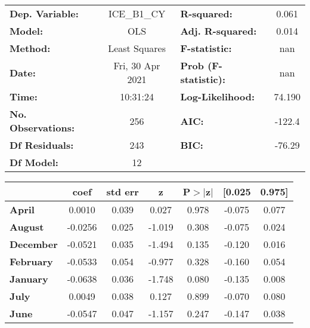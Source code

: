 \begin{center}
\begin{tabular}{lclc}
\toprule
\textbf{Dep. Variable:}    &   ICE\_B1\_CY    & \textbf{  R-squared:         } &     0.061   \\
\textbf{Model:}            &       OLS        & \textbf{  Adj. R-squared:    } &     0.014   \\
\textbf{Method:}           &  Least Squares   & \textbf{  F-statistic:       } &       nan   \\
\textbf{Date:}             & Fri, 30 Apr 2021 & \textbf{  Prob (F-statistic):} &      nan    \\
\textbf{Time:}             &     10:31:24     & \textbf{  Log-Likelihood:    } &    74.190   \\
\textbf{No. Observations:} &         256      & \textbf{  AIC:               } &    -122.4   \\
\textbf{Df Residuals:}     &         243      & \textbf{  BIC:               } &    -76.29   \\
\textbf{Df Model:}         &          12      & \textbf{                     } &             \\
\bottomrule
\end{tabular}
\begin{tabular}{lcccccc}
                   & \textbf{coef} & \textbf{std err} & \textbf{z} & \textbf{P$> |$z$|$} & \textbf{[0.025} & \textbf{0.975]}  \\
\midrule
\textbf{April}     &       0.0010  &        0.039     &     0.027  &         0.978        &       -0.075    &        0.077     \\
\textbf{August}    &      -0.0256  &        0.025     &    -1.019  &         0.308        &       -0.075    &        0.024     \\
\textbf{December}  &      -0.0521  &        0.035     &    -1.494  &         0.135        &       -0.120    &        0.016     \\
\textbf{February}  &      -0.0533  &        0.054     &    -0.977  &         0.328        &       -0.160    &        0.054     \\
\textbf{January}   &      -0.0638  &        0.036     &    -1.748  &         0.080        &       -0.135    &        0.008     \\
\textbf{July}      &       0.0049  &        0.038     &     0.127  &         0.899        &       -0.070    &        0.080     \\
\textbf{June}      &      -0.0547  &        0.047     &    -1.157  &         0.247        &       -0.147    &        0.038     \\

\end{tabular}
\end{center}
